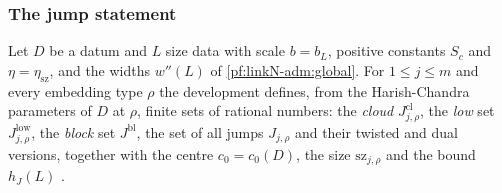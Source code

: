 \subsubsection{The jump statement}

Let $D$ be a datum and $L$ size data with scale $b=b_L$, positive constants $S_c$ and $\eta=\eta_{\mathrm{sz}}$, and the widths
$w''(L)$ of \cref{pf:linkN-adm:global}. For $1\le j\le m$ and every embedding type $\rho$ the development defines, from the
Harish-Chandra parameters of $D$ at $\rho$, finite sets of rational numbers: the \emph{cloud} $J^{\mathrm{cl}}_{j,\rho}$, the
\emph{low} set $J^{\mathrm{low}}_{j,\rho}$, the \emph{block} set $J^{\mathrm{bl}}$, the set of all jumps $J_{j,\rho}$ and their
twisted and dual versions, together with the centre $c_0=c_0(D)$, the size $\mathrm{sz}_{j,\rho}$ and the bound $h_J(L)$
\cite{LeanSource2026}.

